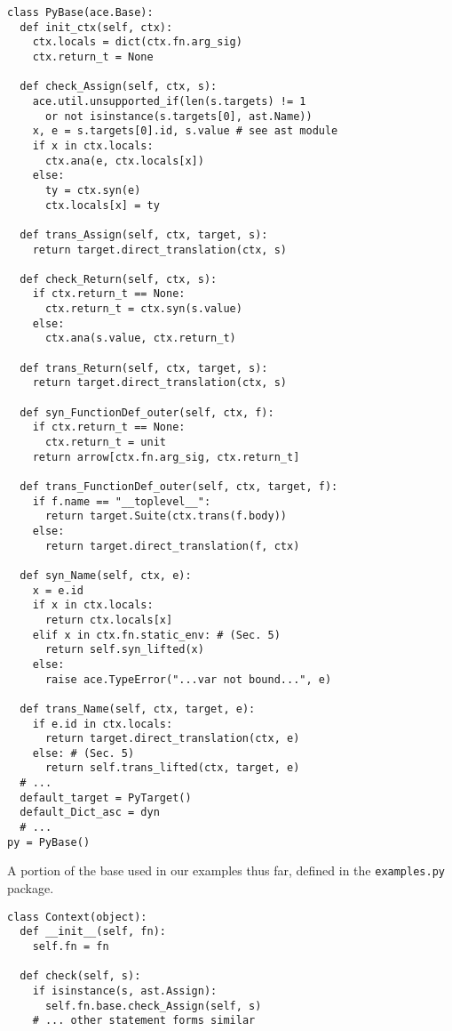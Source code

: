 \documentclass[10pt,preprint]{sigplanconf}
\begin{document}
{\begin{codelisting}
\begin{lstlisting}
class PyBase(ace.Base):
  def init_ctx(self, ctx):
    ctx.locals = dict(ctx.fn.arg_sig)
    ctx.return_t = None

  def check_Assign(self, ctx, s):
    ace.util.unsupported_if(len(s.targets) != 1
      or not isinstance(s.targets[0], ast.Name))
    x, e = s.targets[0].id, s.value # see ast module
    if x in ctx.locals:
      ctx.ana(e, ctx.locals[x])
    else:
      ty = ctx.syn(e)
      ctx.locals[x] = ty
	  
  def trans_Assign(self, ctx, target, s):
    return target.direct_translation(ctx, s)
              
  def check_Return(self, ctx, s):
    if ctx.return_t == None:
      ctx.return_t = ctx.syn(s.value)
    else:
      ctx.ana(s.value, ctx.return_t)
      
  def trans_Return(self, ctx, target, s):
    return target.direct_translation(ctx, s)
          
  def syn_FunctionDef_outer(self, ctx, f):
    if ctx.return_t == None:
      ctx.return_t = unit
    return arrow[ctx.fn.arg_sig, ctx.return_t]
    
  def trans_FunctionDef_outer(self, ctx, target, f):
    if f.name == "__toplevel__":
      return target.Suite(ctx.trans(f.body))
    else:
      return target.direct_translation(f, ctx)

  def syn_Name(self, ctx, e):
    x = e.id
    if x in ctx.locals:
      return ctx.locals[x]
    elif x in ctx.fn.static_env: # (Sec. 5)
      return self.syn_lifted(x)
    else:
      raise ace.TypeError("...var not bound...", e)
      
  def trans_Name(self, ctx, target, e):
    if e.id in ctx.locals:
      return target.direct_translation(ctx, e)
    else: # (Sec. 5)
      return self.trans_lifted(ctx, target, e)
  # ...
  default_target = PyTarget()   
  default_Dict_asc = dyn
  # ...
py = PyBase()
\end{lstlisting}
\caption{A portion of the base used in our examples thus far, defined in the \texttt{examples.py} package.}
\label{pybase}
\end{codelisting}

\begin{codelisting}
\begin{lstlisting}
class Context(object):
  def __init__(self, fn):
    self.fn = fn
    
  def check(self, s):
    if isinstance(s, ast.Assign):
      self.fn.base.check_Assign(self, s)
    # ... other statement forms similar


\end{lstlisting}
\end{codelisting}}
\end{document}
